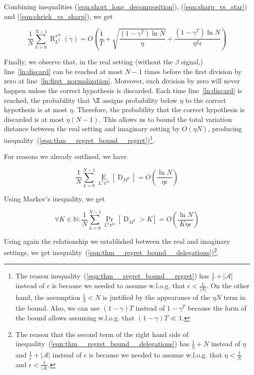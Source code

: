\documentclass[anon,12pt]{colt2018} %
\newcommand{\AP}[1]{\left(#1\right)}
\newcommand{\AB}[1]{\left[#1\right]}
\newcommand{\Pa}[2]{\underset{#1}{\operatorname{Pr}}\AB{#2}}
\newcommand{\Ea}[2]{\underset{#1}{\operatorname{E}}\AB{#2}}
\newcommand{\Nats}{\mathbb{N}}
\newcommand{\Abs}[1]{\left\vert #1 \right\vert}
\newcommand{\A}{\mathcal{A}}
\newcommand{\Rg}{\operatorname{R}}
\newcommand{\Tn}{\mathfrak{t}}
\newcommand{\ND}{\operatorname{D}}
\newcommand{\IP}{\pi^{!k}}
\begin{document}
Combining inequalities (\ref{eqn:short_long_decomposition}), (\ref{eqn:sharp_vs_star}) and (\ref{eqn:shriek_vs_sharp}), we get

\begin{equation}
\label{eqn:regret_shriek}
\frac{1}{N}\sum_{k=0}^{N-1}\Rg_{L^k}^{\IP}(\gamma) = O\AP{\frac{\bar{\Tn}}{T}+\sqrt{\frac{\AP{1-\gamma^T}\ln{N}}{\eta}}+\frac{\AP{1-\gamma^T}\ln{N}}{\eta^2\epsilon}}
\end{equation}

Finally, we observe that, in the real setting (without the $\beta$ signal,) line~\ref{ln:discard} can be reached at most $N-1$ times before the first division by zero at line~\ref{ln:first_normalization}. Moreover, such division by zero will never happen unless the correct hypothesis is discarded. Each time line~\ref{ln:discard} is reached, the probability that $\Z$ assigns probability below $\eta$ to the correct hypothesis is at most $\eta$. Therefore, the probability that the correct hypothesis is discarded is at most $\eta(N-1)$. This allows us to bound the total variation distance between the real setting and imaginary setting by $O(\eta N)$, producing inequality~(\ref{eqn:thm__regret_bound__regret})\footnote{The reason inequality~(\ref{eqn:thm__regret_bound__regret}) has $\frac{1}{\epsilon}+\Abs{\A}$ instead of $\epsilon$ is because we needed to assume w.l.o.g. that $\epsilon < \frac{1}{\Abs{A}}$. On the other hand, the assumption $\frac{1}{\eta}<N$ is justified by the appearance of the $\eta N$ term in the bound. Also, we can use $(1-\gamma)T$ instead of $1-\gamma^T$ because the form of the bound allows assuming w.l.o.g. that $(1-\gamma)T \ll 1$.}.

For reasons we already outlined, we have

\begin{equation}
\frac{1}{N}\sum_{k=0}^{N-1} \Ea{L^k\pi^{!k}}{\ND_{M^k}} = O\AP{\frac{\ln{N}}{\eta\epsilon}}
\end{equation}

Using Markov's inequality, we get

\begin{equation}
\forall K\in\Nats: \frac{1}{N}\sum_{k=0}^{N-1} \Pa{L^k\pi^{!k}}{\ND_{M^k}> K} = O\AP{\frac{\ln{N}}{K\eta\epsilon}}
\end{equation}

Using again the relationship we established between the real and imaginary settings, we get inequality~(\ref{eqn:thm__regret_bound__delegations})\footnote{The reason that the second term of the right hand side of inequality~(\ref{eqn:thm__regret_bound__delegations}) has $\frac{1}{\eta}+N$ instead of $\eta$ and $\frac{1}{\epsilon}+\Abs{\A}$ instead of $\epsilon$ is because we needed to assume w.l.o.g. that $\eta < \frac{1}{N}$ and $\epsilon < \frac{1}{\Abs{A}}$.}.
\end{document}
